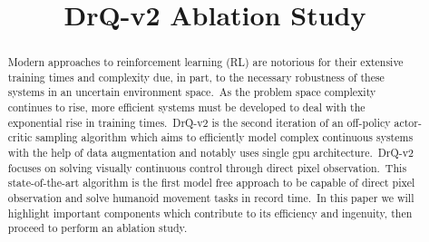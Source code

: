 \documentclass[conference]{./IEEEtran/IEEEtran} %
\begin{document}
    \title{DrQ-v2 Ablation Study}

    \author{
        \and
        \and
    }

    \maketitle

    \begin{abstract}
        
    Modern approaches to reinforcement learning (RL) are notorious for their extensive training times and complexity due, in part, 
    to the necessary robustness of these systems in an uncertain environment space.\ As the problem space complexity continues to rise,
    more efficient systems must be developed to deal with the exponential rise in training times.\ DrQ-v2 is the second iteration of an
    off-policy actor-critic sampling algorithm which aims to efficiently model complex continuous systems with the help of data 
    augmentation and notably uses single gpu architecture.\ DrQ-v2 focuses on solving visually continuous control through direct pixel
    observation.\ This state-of-the-art algorithm is the first model free approach to be capable of direct pixel observation and solve
    humanoid movement tasks in record time.\ In this paper we will highlight important components which contribute to its efficiency and
    ingenuity, then proceed to perform an ablation study. 


    \end{abstract}
\end{document}
